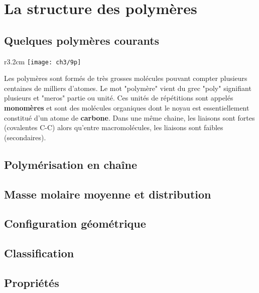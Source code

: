 \section{La structure des polymères}
	\subsection{Quelques polymères courants}
		\begin{wrapfigure}[2]{r}{3.2cm}
		\vspace{-5mm}
		\texttt{[image: ch3/9p]}
		\end{wrapfigure}	
		Les polymères sont formés de très grosses molécules pouvant compter plusieurs centaines de milliers d'atomes. Le mot "polymère" vient du grec "poly" signifiant plusieurs et "meros" partie ou unité. Ces unités de répétitions sont appelés \textbf{monomères} et sont des molécules organiques dont le noyau est essentiellement constitué d'un atome de \textbf{carbone}. Dans une même chaine, les liaisons sont fortes (covalentes C-C) alors qu'entre macromolécules, les liaisons sont faibles (secondaires).
	\subsection{Polymérisation en chaîne}
	\subsection{Masse molaire moyenne et distribution}
	\subsection{Configuration géométrique}
	\subsection{Classification}
	\subsection{Propriétés}
	

